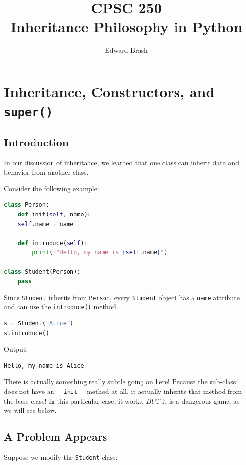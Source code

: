 \documentclass[11pt]{article}
\title{CPSC 250 \\ Inheritance Philosophy in Python}
\author{Edward Brash}
\date{}
\begin{document}
\maketitle

\section{Inheritance, Constructors, and \texttt{super()}}

\subsection{Introduction}

In our discussion of inheritance, we learned that one class can inherit data and behavior from another class.

Consider the following example:

\begin{lstlisting}[language=Python]
class Person:
    def init(self, name):
    self.name = name

    def introduce(self):
        print(f"Hello, my name is {self.name}")

class Student(Person):
    pass
\end{lstlisting}

Since \texttt{Student} inherits from \texttt{Person}, every \texttt{Student} object has a \texttt{name} attribute and can use the \texttt{introduce()} method.

\begin{lstlisting}[language=Python]
s = Student("Alice")
s.introduce()
\end{lstlisting}

Output:

\begin{verbatim}
Hello, my name is Alice
\end{verbatim}

There is actually something really subtle going on here!  Because the sub-class does not have an \verb|__init__| method at all, it actually
inherits that method from the base class!  In this particular case, it works, $BUT$ it is a dangerous game, as we will see below.

\subsection{A Problem Appears}

Suppose we modify the \texttt{Student} class:
\end{document}
